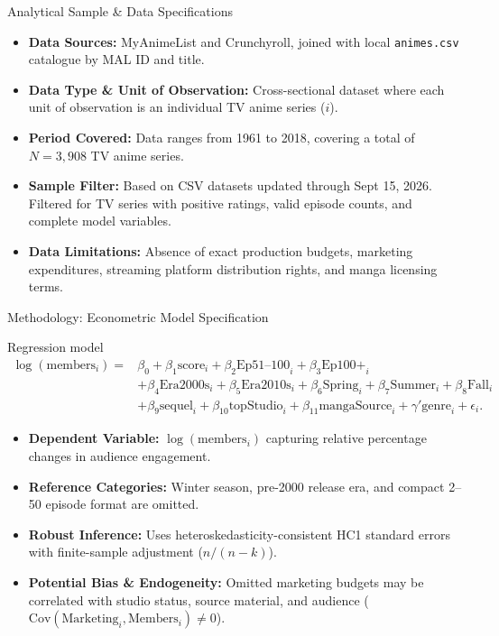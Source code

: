 \documentclass[aspectratio=169,11pt]{beamer}
\begin{document}
\begin{frame}{Analytical Sample \& Data Specifications}
  \small
  \begin{itemize}
    \item \textbf{Data Sources:} MyAnimeList and Crunchyroll, joined with
      local \texttt{animes.csv} catalogue by MAL ID and title.
    \item \textbf{Data Type \& Unit of Observation:} Cross-sectional dataset
      where each unit of observation is an individual TV anime series ($i$).
    \item \textbf{Period Covered:} Data ranges from 1961 to 2018, covering a
      total of $N=3,908$ TV anime series.
    \item \textbf{Sample Filter:} Based on CSV datasets updated through Sept
      15, 2026. Filtered for TV series with positive ratings, valid episode
      counts, and complete model variables.
    \item \textbf{Data Limitations:} Absence of exact production budgets,
      marketing expenditures, streaming platform distribution rights, and
      manga licensing terms.
  \end{itemize}
\end{frame}

\begin{frame}{Methodology: Econometric Model Specification}
  \begin{block}{Regression model}
    \scriptsize
    \begin{equation*}
      \begin{aligned}
      \log(\text{members}_i) ={}&
        \beta_0 + \beta_1 \text{score}_i
        + \beta_2 \text{Ep51--100}_i
        + \beta_{3}\text{Ep100+}_{i} \\
      &+ \beta_4 \text{Era2000s}_i
        + \beta_5 \text{Era2010s}_i
        + \beta_6 \text{Spring}_i
        + \beta_7 \text{Summer}_i
        + \beta_8 \text{Fall}_i \\
      &+ \beta_{9}\text{sequel}_{i}
        + \beta_{10} \text{topStudio}_i
        + \beta_{11} \text{mangaSource}_i
        + \gamma' \text{genre}_i + \epsilon_i.
      \end{aligned}
    \end{equation*}
  \end{block}
  \footnotesize
  \begin{itemize}\setlength{\itemsep}{.2em}
    \item \textbf{Dependent Variable:} $\log(\text{members}_i)$ capturing
      relative percentage changes in audience engagement.
    \item \textbf{Reference Categories:} Winter season, pre-2000 release era,
      and compact 2--50 episode format are omitted.
    \item \textbf{Robust Inference:} Uses heteroskedasticity-consistent HC1
      standard errors with finite-sample adjustment ($n/(n-k)$).
    \item \textbf{Potential Bias \& Endogeneity:} Omitted marketing budgets
      may be correlated with studio status, source material, and audience
      ($\text{Cov}(\text{Marketing}_i, \text{Members}_i) \neq 0$).
  \end{itemize}
\end{frame}
\end{document}
